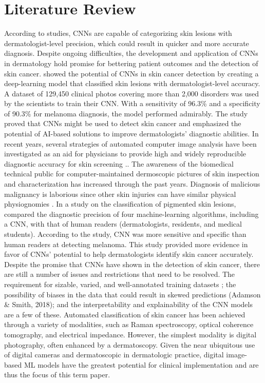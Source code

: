 \documentclass[twocolumn]{article}
\begin{document}
\section{Literature Review}
According to studies, CNNs are capable of categorizing skin lesions with dermatologist-level precision, which could result in quicker and more accurate diagnosis. Despite ongoing difficulties, the development and application of CNNs in dermatology hold promise for bettering patient outcomes and the detection of skin cancer.\cite{esteva2017dermatologist} showed the potential of CNNs in skin cancer detection by creating a deep-learning model that classified skin lesions with dermatologist-level accuracy. A dataset of 129,450 clinical photos covering more than 2,000 disorders was used by the scientists to train their CNN. With a sensitivity of 96.3\% and a specificity of 90.3\% for melanoma diagnosis, the model performed admirably. The study proved that CNNs might be used to detect skin cancer and emphasized the potential of AI-based solutions to improve dermatologists' diagnostic abilities.
 In recent years, several strategies of automated computer image analysis have been investigated as an aid for physicians to provide high and widely reproducible diagnostic accuracy for skin screening \cite{haenssle2018man}.. The awareness of the biomedical technical public for computer-maintained dermoscopic pictures of skin inspection and characterization has increased through the past years. Diagnosis of malicious malignancy is laborious since other skin injuries can have similar physical physiognomies \cite{deshpande2016automated}. In a study on the classification of pigmented skin lesions, \cite{tschandl2019comparison} compared the diagnostic precision of four machine-learning algorithms, including a CNN, with that of human readers (dermatologists, residents, and medical students). According to the study, CNN was more sensitive and specific than human readers at detecting melanoma. This study provided more evidence in favor of CNNs' potential to help dermatologists identify skin cancer accurately.
Despite the promise that CNNs have shown in the detection of skin cancer, there are still a number of issues and restrictions that need to be resolved. The requirement for sizable, varied, and well-annotated training datasets \cite{han2018classification}; the possibility of biases in the data that could result in skewed predictions (Adamson \& Smith, 2018); and the interpretability and explainability of the CNN models \cite{holzinger2019causability} are a few of these.
Automated classification of skin cancer has been achieved through a variety of modalities, such as Raman spectroscopy, optical coherence tomography, and electrical impedance. However, the simplest modality is digital photography, often enhanced by a dermatoscopy. Given the near ubiquitous use of digital cameras and dermatoscopic in dermatologic practice, digital image-based ML models have the greatest potential for clinical implementation and are thus the focus of this term paper. 
\end{document}
